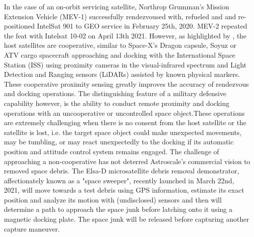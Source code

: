 In the case of an on-orbit servicing satellite, Northrop Grumman's Mission Extension Vehicle (MEV-1) \cite{mev121}  successfully rendezvoused with, refueled and and re-positioned IntelSat 901 to GEO service in February 25th, 2020.  MEV-2 repeated the feat with Intelsat 10-02 on April 13th 2021. However, as highlighted by \cite{darkArts21}, the host satellites are cooperative, similar to Space-X's Dragon capsule, Soyuz or ATV cargo spacecraft approaching and docking with the International Space Station (ISS) using proximity cameras in the visual-infrared spectrum and Light Detection and Ranging sensors (LiDARs) assisted by known physical markers. These cooperative proximity sensing greatly improves the accuracy of rendezvous and docking operations. The distinguishing feature of a military defensive capability however, is the ability to conduct remote proximity and docking operations with an uncooperative or uncontrolled space object.These operations are extremely challenging when there is no consent from the host satellite or the satellite is lost, i.e. the target space object could make unexpected movements, may be tumbling, or may react unexpectedly to the docking if its automatic position and attitude control system remains engaged. The challenge of approaching a non-cooperative has not deterred Astroscale's commercial vision to removed space debris. The Elsa-D microsatellite debris removal demonstrator, affectionately known as a "space sweeper", recently launched in March 22nd, 2021, will move towards a test debris using GPS information, estimate its exact position and analyze its motion with (undisclosed) sensors and then will determine a path to approach the space junk before latching onto it using a magnetic docking plate. The space junk will be released before capturing another capture maneuver\cite{elsaD19}.   

